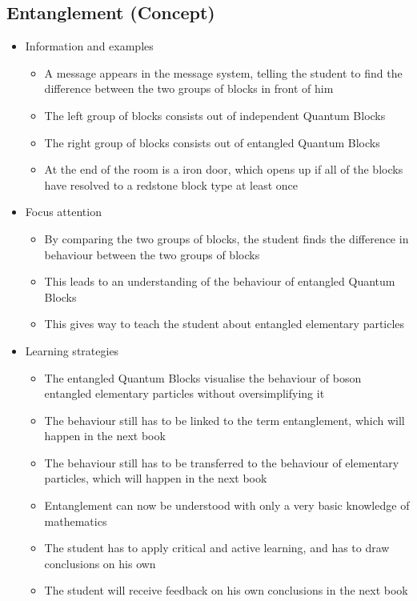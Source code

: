 \documentclass[11pt,twoside]{report} %
\begin{document}
\subsection{Entanglement (Concept)}
\begin{itemize}
	\item Information and examples
	\begin{itemize}
		\item A message appears in the message system, telling the student to find the difference between the two groups of blocks in front of him
		\item The left group of blocks consists out of independent Quantum Blocks
		\item The right group of blocks consists out of entangled Quantum Blocks
		\item At the end of the room is a iron door, which opens up if all of the blocks have resolved to a redstone block type at least once
	\end{itemize}
	\item Focus attention
	\begin{itemize}
		\item By comparing the two groups of blocks, the student finds the difference in behaviour between the two groups of blocks
		\item This leads to an understanding of the behaviour of entangled Quantum Blocks
		\item This gives way to teach the student about entangled elementary particles
	\end{itemize}
	\item Learning strategies
	\begin{itemize}
		\item The entangled Quantum Blocks visualise the behaviour of boson entangled elementary particles without oversimplifying it
		\item The behaviour still has to be linked to the term entanglement, which will happen in the next book
		\item The behaviour still has to be transferred to the behaviour of elementary particles, which will happen in the next book
		\item Entanglement can now be understood with only a very basic knowledge of mathematics
		\item The student has to apply critical and active learning, and has to draw conclusions on his own
		\item The student will receive feedback on his own conclusions in the next book

\end{itemize}
\end{itemize}
\end{document}
